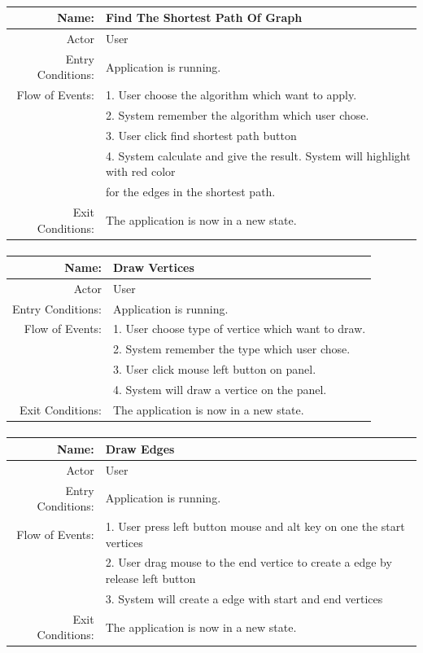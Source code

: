 \documentclass[a4paper,10pt]{article}
\begin{document}
\paragraph{}
\begin{tabular}{|r|l|}
\hline
Name: & Find The Shortest Path Of Graph \\
\hline
Actor & User \\
\hline
Entry Conditions: & Application is running. \\
\hline
Flow of Events: & 1. User choose the algorithm which want to apply. \\


& 2. System remember the algorithm which user chose.  \\
& 3. User click find shortest path button  \\
& 4. System calculate and give the result. System will highlight with red color  \\
& for the edges in the shortest path. \\
\hline
Exit Conditions: & The application is now in a new state. \\
\hline
\end{tabular}
\paragraph{}
\begin{tabular}{|r|l|}
\hline
Name: & Draw Vertices \\
\hline
Actor & User \\
\hline
Entry Conditions: & Application is running. \\
\hline
Flow of Events: & 1. User choose type of vertice which want to draw. \\


& 2. System remember the type which user chose.  \\
& 3. User click mouse left button on panel.  \\
& 4. System will draw a vertice on the panel.  \\
\hline
Exit Conditions: & The application is now in a new state. \\
\hline

\end{tabular}

\paragraph{}
\begin{tabular}{|r|l|}
\hline
Name: & Draw Edges \\
\hline
Actor & User \\
\hline
Entry Conditions: & Application is running. \\
\hline
Flow of Events: & 1. User press left button mouse and alt key on one the start vertices \\
& 2. User drag mouse to the end vertice to create a edge by release left button\\
& 3. System will create a edge with start and end vertices\\
\hline
Exit Conditions: & The application is now in a new state. \\
\hline

\end{tabular}
\end{document}
